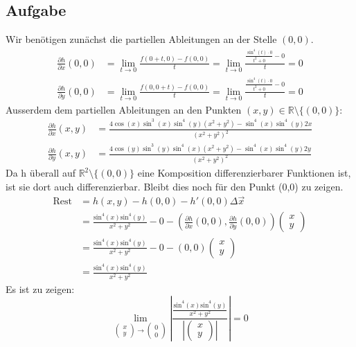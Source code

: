 \documentclass[10pt,a4paper,parskip=half]{scrartcl}
\begin{document}
\begin{enumerate}[(i)]
\section{Aufgabe}
Wir benötigen zunächst die partiellen Ableitungen an der Stelle $(0,0)$.
\begin{align*}
\frac{\partial h}{\partial x} (0,0) &= \lim_{t \to 0} \frac{f(0+t,0)-f(0,0)}{t} = \lim_{t \to 0} \frac{\frac{\sin^4(t)\cdot 0}{t^2+0}-0}{t} = 0\\
\frac{\partial h}{\partial y} (0,0) &= \lim_{t \to 0} \frac{f(0,0+t) - f(0,0)}{t} = \lim_{t \to 0} \frac{\frac{\sin^4(t)\cdot 0}{t^2+0}-0}{t} = 0
\end{align*}
Ausserdem dem partiellen Ableitungen an den Punkten $(x,y) \in \mathbb{R}\setminus\{(0,0)\}$:
\begin{align*}
\frac{\partial h}{\partial x} (x,y) &= \frac{4\cos(x)\sin^3(x)\sin^4(y)(x^2 + y^2) - \sin^4(x)\sin^4(y)2x}{(x^2 + y^2)^2}\\
\frac{\partial h}{\partial y} (x,y) &= \frac{4\cos(y)\sin^3(y)\sin^4(x)(x^2 + y^2) - \sin^4(x)\sin^4(y)2y}{(x^2 + y^2)^2}
\end{align*}
Da h überall auf $\mathbb R^2\setminus{\{(0,0)\}}$ eine Komposition differenzierbarer Funktionen ist, ist sie dort auch differenzierbar. Bleibt dies noch für den Punkt (0,0) zu zeigen.
\begin{align*}
\text{Rest} &= h(x,y) - h(0,0) - h'(0,0) \Delta \vec x\\
&= \frac{\text{sin}^4(x)\text{sin}^4(y)}{x^2 + y^2} - 0 - \left(\frac{\partial h}{\partial x}(0,0),\frac{\partial h}{\partial y}(0,0)\right) \begin{pmatrix}x\\y\end{pmatrix}\\
&= \frac{\text{sin}^4(x)\text{sin}^4(y)}{x^2 + y^2} - 0 - (0,0) \begin{pmatrix}x\\y\end{pmatrix}\\
&= \frac{\text{sin}^4(x)\text{sin}^4(y)}{x^2 + y^2}
\end{align*}
Es ist zu zeigen: $$\lim_{\begin{pmatrix}x\\y\end{pmatrix} \to \begin{pmatrix}0\\0\end{pmatrix}} \left|\frac{\frac{\text{sin}^4(x)\text{sin}^4(y)}{x^2 + y^2}}{\left|\begin{pmatrix}x\\y\end{pmatrix}\right|}\right| = 0$$

\end{enumerate}
\end{document}
